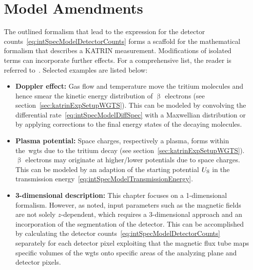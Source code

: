 \section{Model Amendments}
The outlined formalism that lead to the expression for the detector counts~\eqref{eq:intSpecModelDetectorCounts} forms a scaffold for the mathematical formalism that describes a KATRIN measurement. Modifications of isolated terms can incorporate further effects. For a comprehensive list, the reader is referred to~\cite{Kleesiek2019}. Selected examples are listed below:
\begin{itemize}
	\item \textbf{Doppler effect:} Gas flow and temperature move the tritium molecules and hence smear the kinetic energy distribution of $\upbeta$ electrons (see section~\ref{sec:katrinExpSetupWGTS}). This can be modeled by convolving the differential rate~\eqref{eq:intSpecModelDiffSpec} with a Maxwellian distribution or by applying corrections to the final energy states of the decaying molecules.
	\item \textbf{Plasma potential:} Space charges, respectively a plasma, forms within the~\gls{wgts} due to the tritium decay (see section~\ref{sec:katrinExpSetupWGTS}). $\upbeta$ electrons may originate at higher/lower potentials due to space charges. This can be modeled by an adaption of the starting potential $U_\mathrm{S}$ in the transmission energy~\eqref{eq:intSpecModelTransmissionEnergy}.
	\item \textbf{3-dimensional description:} This chapter focuses on a 1-dimensional formalism. However, as noted, input parameters such as the magnetic fields are not solely \mbox{$z$-dependent}, which requires a 3-dimensional approach and an incorporation of the segmentation of the detector. This can be accomplished by calculating the detector counts~\eqref{eq:intSpecModelDetectorCounts} separately for each detector pixel exploiting that the magnetic flux tube maps specific volumes of the \gls{wgts} onto specific areas of the analyzing plane and detector pixels.
\end{itemize}

